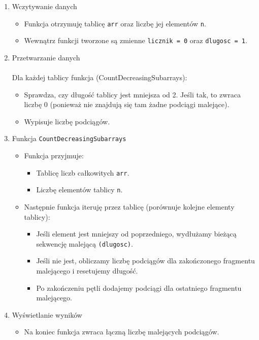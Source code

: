 \documentclass[a4paper,12pt]{article}
\begin{document}
\begin{enumerate}
\item{Wczytywanie danych}
\begin{itemize}
\item{Funkcja otrzymuję tablicę \texttt{arr} oraz liczbę jej elementów \texttt{n}.}
\item{Wewnątrz funkcji tworzone są zmienne \texttt{licznik = 0} oraz \texttt{dlugosc = 1}.}
\end{itemize}
\item{Przetwarzanie danych}\\ \\
Dla każdej tablicy funkcja (CountDecreasingSubarrays):
\begin{itemize}
\item{Sprawdza, czy długość tablicy jest mniejsza od 2. Jeśli tak, to zwraca liczbę 0 (ponieważ nie znajdują się tam żadne podciągi malejące).}
\item{Wypisuje liczbę podciągów.}
\end{itemize}
\item{Funkcja \texttt{CountDecreasingSubarrays}}
\begin{itemize}
\item{Funkcja przyjmuje:}
\begin{itemize}
\item[\textbullet]{Tablicę liczb całkowitych \texttt{arr}.}
\item[\textbullet]{Liczbę elementów tablicy \texttt{n}.}
\end{itemize}
\item{Następnie funkcja iteruję przez tablicę (porównuje kolejne elementy tablicy):}
\begin{itemize}
\item[\textbullet]{Jeśli element jest mniejszy od poprzedniego, wydłużamy bieżącą sekwencję malejącą \texttt{(dlugosc)}.}
\item[\textbullet]{Jeśli nie jest, obliczamy liczbę podciągów dla zakończonego fragmentu malejącego i resetujemy długość.}
\item[\textbullet]{Po zakończeniu pętli dodajemy podciągi dla ostatniego fragmentu malejącego.}
\end{itemize}
\end{itemize}
\item{Wyświetlanie wyników}
\begin{itemize}
\item{Na koniec funkcja zwraca łączną liczbę malejących podciągów.}
\end{itemize}
\end{enumerate}
\end{document}
